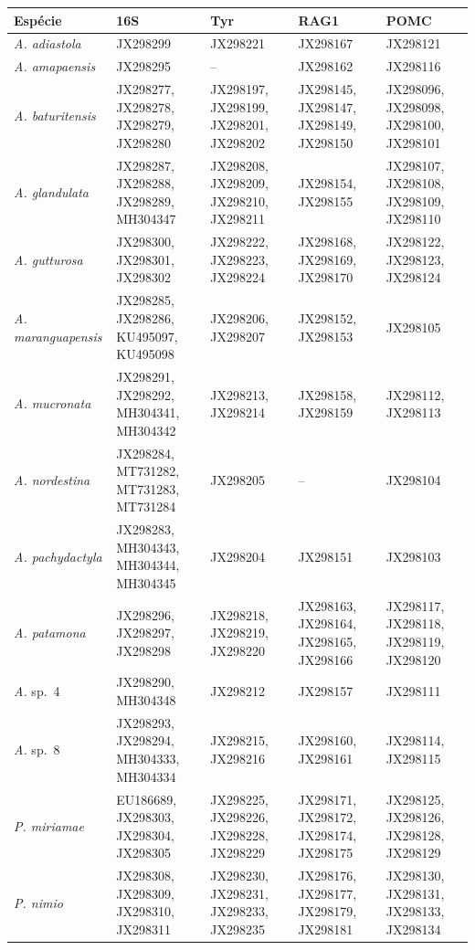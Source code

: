 \documentclass[11pt,a4paper]{article}
\begin{document}
\begin{center}
\scriptsize\setlength{\tabcolsep}{3pt}
\begin{tabular}{@{}>{\raggedright}p{2.6cm}>{\raggedright}p{3.2cm}>{\raggedright}p{2.95cm}%
>{\raggedright}p{2.95cm}>{\raggedright\arraybackslash}p{2.95cm}@{}}
\toprule
Espécie & 16S & Tyr & RAG1 & POMC \\
\midrule
\emph{A. adiastola} & JX298299 & JX298221 & JX298167 & JX298121 \\
\emph{A. amapaensis} & JX298295 & -- & JX298162 & JX298116 \\
\emph{A. baturitensis} & JX298277, JX298278, JX298279, JX298280 & JX298197, JX298199, JX298201, JX298202 & JX298145, JX298147, JX298149, JX298150 & JX298096, JX298098, JX298100, JX298101 \\
\emph{A. glandulata} & JX298287, JX298288, JX298289, MH304347 & JX298208, JX298209, JX298210, JX298211 & JX298154, JX298155 & JX298107, JX298108, JX298109, JX298110 \\
\emph{A. gutturosa} & JX298300, JX298301, JX298302 & JX298222, JX298223, JX298224 & JX298168, JX298169, JX298170 & JX298122, JX298123, JX298124 \\
\emph{A. maranguapensis} & JX298285, JX298286, KU495097, KU495098 & JX298206, JX298207 & JX298152, JX298153 & JX298105 \\
\emph{A. mucronata} & JX298291, JX298292, MH304341, MH304342 & JX298213, JX298214 & JX298158, JX298159 & JX298112, JX298113 \\
\emph{A. nordestina} & JX298284, MT731282, MT731283, MT731284 & JX298205 & -- & JX298104 \\
\emph{A. pachydactyla} & JX298283, MH304343, MH304344, MH304345 & JX298204 & JX298151 & JX298103 \\
\emph{A. patamona} & JX298296, JX298297, JX298298 & JX298218, JX298219, JX298220 & JX298163, JX298164, JX298165, JX298166 & JX298117, JX298118, JX298119, JX298120 \\
\emph{A.} sp.~4 & JX298290, MH304348 & JX298212 & JX298157 & JX298111 \\
\emph{A.} sp.~8 & JX298293, JX298294, MH304333, MH304334 & JX298215, JX298216 & JX298160, JX298161 & JX298114, JX298115 \\
\emph{P. miriamae} & EU186689, JX298303, JX298304, JX298305 & JX298225, JX298226, JX298228, JX298229 & JX298171, JX298172, JX298174, JX298175 & JX298125, JX298126, JX298128, JX298129 \\
\emph{P. nimio} & JX298308, JX298309, JX298310, JX298311 & JX298230, JX298231, JX298233, JX298235 & JX298176, JX298177, JX298179, JX298181 & JX298130, JX298131, JX298133, JX298134 \\
\bottomrule
\end{tabular}
\end{center}
\end{document}
